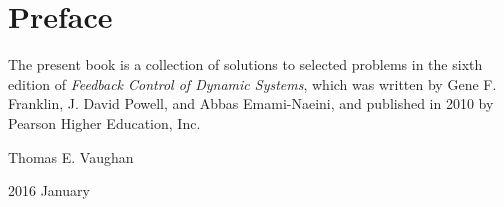 
\chapter{Preface}

The present book is a collection of solutions to selected problems in the sixth
edition of {\it Feedback Control of Dynamic Systems}, which was written by Gene
F. Franklin, J. David Powell, and Abbas Emami-Naeini, and published in 2010 by
Pearson Higher Education, Inc.

\vspace{0.25in}

\begin{flushright}
Thomas E. Vaughan

2016 January
\end{flushright}

